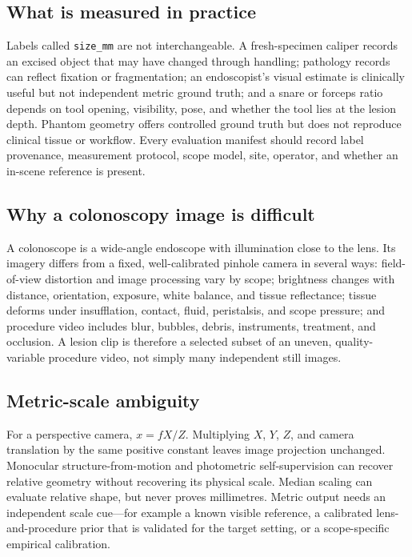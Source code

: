 \documentclass[11pt]{article}
\begin{document}
\subsection{What is measured in practice}

Labels called \texttt{size\_mm} are not interchangeable. A fresh-specimen
caliper records an excised object that may have changed through handling;
pathology records can reflect fixation or fragmentation; an endoscopist's
visual estimate is clinically useful but not independent metric ground truth;
and a snare or forceps ratio depends on tool opening, visibility, pose, and
whether the tool lies at the lesion depth. Phantom geometry offers controlled
ground truth but does not reproduce clinical tissue or workflow. Every
evaluation manifest should record label provenance, measurement protocol,
scope model, site, operator, and whether an in-scene reference is present.

\subsection{Why a colonoscopy image is difficult}

A colonoscope is a wide-angle endoscope with illumination close to the lens.
Its imagery differs from a fixed, well-calibrated pinhole camera in several
ways: field-of-view distortion and image processing vary by scope; brightness
changes with distance, orientation, exposure, white balance, and tissue
reflectance; tissue deforms under insufflation, contact, fluid, peristalsis,
and scope pressure; and procedure video includes blur, bubbles, debris,
instruments, treatment, and occlusion. A lesion clip is therefore a selected
subset of an uneven, quality-variable procedure video, not simply many
independent still images.

\subsection{Metric-scale ambiguity}

For a perspective camera, $x=fX/Z$. Multiplying $X$, $Y$, $Z$, and camera
translation by the same positive constant leaves image projection unchanged.
Monocular structure-from-motion and photometric self-supervision can recover
relative geometry without recovering its physical scale. Median scaling can
evaluate relative shape, but never proves millimetres. Metric output needs an
independent scale cue---for example a known visible reference, a calibrated
lens-and-procedure prior that is validated for the target setting, or a
scope-specific empirical calibration.
\end{document}
